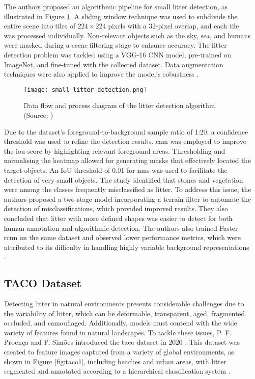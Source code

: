 The authors proposed an algorithmic pipeline for small litter detection, as illustrated in Figure \ref{fig:smalllitterdetection}. A sliding window technique was used to subdivide the entire scene into tiles of $224 \times 224$ pixels with a 32-pixel overlap, and each tile was processed individually. Non-relevant objects such as the sky, sea, and humans were masked during a scene filtering stage to enhance accuracy. The litter detection problem was tackled using a VGG-16 CNN model, pre-trained on ImageNet, and fine-tuned with the collected dataset. Data augmentation techniques were also applied to improve the model’s robustness \cite{small_litter_detection}.

\begin{figure}[!htbp]
    \centering
    \texttt{[image: small\_litter\_detection.png]}
    \caption{Data flow and process diagram of the litter detection algorithm. (Source: \cite{small_litter_detection})}
    \label{fig:smalllitterdetection}
\end{figure}

Due to the dataset’s foreground-to-background sample ratio of 1:20, a confidence threshold was used to refine the detection results. \gls{cam} was employed to improve the \gls{iou} score by highlighting relevant foreground areas. Thresholding and normalising the heatmap allowed for generating masks that effectively located the target objects. An IoU threshold of 0.01 for \gls{nms} was used to facilitate the detection of very small objects.
The study identified that stones and vegetation were among the classes frequently misclassified as litter. To address this issue, the authors proposed a two-stage model incorporating a terrain filter to automate the detection of misclassifications, which provided improved results. They also concluded that litter with more defined shapes was easier to detect for both human annotation and algorithmic detection. 
The authors also trained Faster \gls{rcnn} on the same dataset and observed lower performance metrics, which were attributed to its difficulty in handling highly variable background representations \cite{small_litter_detection}.

\subsection{TACO Dataset}
\label{subsec:3_tacodataset}

Detecting litter in natural environments presents considerable challenges due to the variability of litter, which can be deformable, transparent, aged, fragmented, occluded, and camouflaged. Additionally, models must contend with the wide variety of features found in natural landscapes. To tackle these issues, P. F. Proença and P. Simões introduced the \gls{taco} dataset in 2020 \cite{taco2020}. This dataset was created to feature images captured from a variety of global environments, as shown in Figure \ref{fig:taco1}, including beaches and urban areas, with litter segmented and annotated according to a hierarchical classification system \cite{taco2020}.

